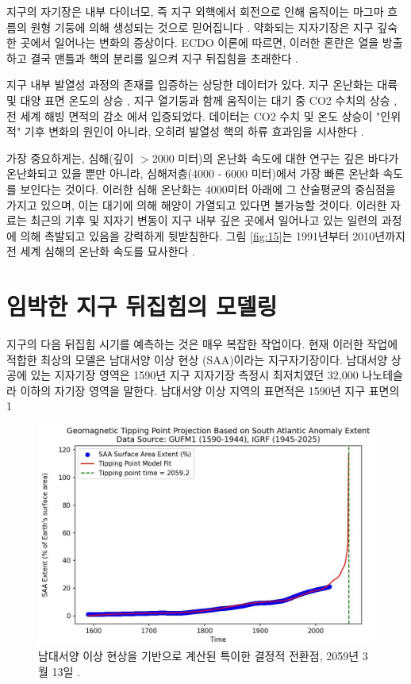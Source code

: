 \documentclass[10pt,twocolumn,letterpaper]{article}
\begin{document}
지구의 자기장은 내부 다이너모, 즉 지구 외핵에서 회전으로 인해 움직이는 마그마 흐름의 원형 기둥에 의해 생성되는 것으로 믿어집니다 \cite{123}. 약화되는 지자기장은 지구 깊숙한 곳에서 일어나는 변화의 증상이다. ECDO 이론에 따르면, 이러한 혼란은 열을 방출하고 결국 맨틀과 핵의 분리를 일으켜 지구 뒤집힘을 초래한다 \cite{1}.

지구 내부 발열성 과정의 존재를 입증하는 상당한 데이터가 있다. 지구 온난화는 대륙 및 대양 표면 온도의 상승 \cite{127,128}, 지구 열기둥과 함께  움직이는 대기 중 CO2 수치의 상승 \cite{129,130}, 전 세계 해빙 면적의 감소 \cite{131}에서 입증되었다. 데이터는 CO2 수치 및 온도 상승이 "인위적" 기후 변화의 원인이 아니라, 오히려 발열성 핵의 하류 효과임을 시사한다 \cite{129}.

가장 중요하게는, 심해(깊이 $>$2000 미터)의 온난화 속도에 대한 연구는 깊은 바다가 온난화되고 있을 뿐만 아니라, 심해저층(4000 - 6000 미터)에서 가장 빠른 온난화 속도를 보인다는 것이다. 이러한 심해 온난화는 4000미터 아래에 그 산술평균의 중심점을 가지고 있으며\cite{132,129}, 이는 대기에 의해  해양이 가열되고 있다면 불가능할 것이다. 이러한 자료는 최근의  기후 및 지자기 변동이 지구 내부 깊은 곳에서 일어나고 있는 일련의 과정에 의해 촉발되고 있음을 강력하게 뒷받침한다. 그림 \ref{fig:15}는 1991년부터 2010년까지 전 세계 심해의 온난화 속도를 묘사한다 \cite{132}.

\section{임박한 지구 뒤집힘의 모델링}

지구의 다음 뒤집힘 시기를 예측하는 것은 매우 복잡한 작업이다. 현재 이러한 작업에 적합한 최상의 모델은 남대서양 이상 현상 (SAA)이라는 지구자기장이다. 남대서양 상공에 있는 지자기장 영역은 1590년 지구 지자기장 측정시 최저치였던 32,000 나노테슬라 \cite{135}이하의 자기장 영역을 말한다. 남대서양 이상 지역의 표면적은 1590년 지구 표면의 1%

\begin{figure}[t]
\begin{center}
   \includegraphics[width=1\linewidth]{saa-crop.jpeg}
\end{center}
   \caption{남대서양 이상 현상을 기반으로 계산된 특이한 결정적 전환점, 2059년 3월 13일 \cite{125,126}.}
\label{fig:16}
\label{fig:onecol}
\end{figure}
\end{document}
